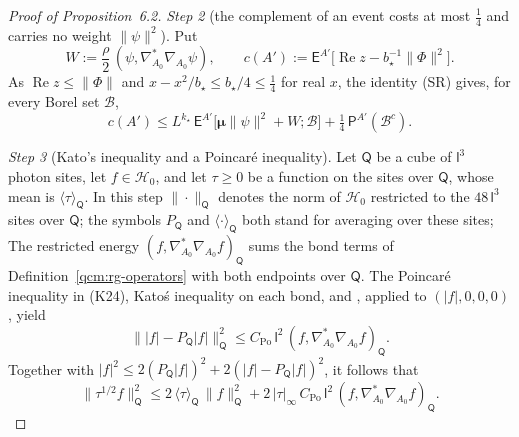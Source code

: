 \documentclass[11pt,letterpaper,reqno]{amsart}
\theoremstyle{definition}
\begin{document}
\begin{proof}[Proof of Proposition~6.2]
\emph{Step 2} (the complement of an event costs at most $\frac14$ and carries no weight $\|\psi\|^2$).
Put
\begin{equation*}
W:=\frac\rho2\,(\psi,\nabla^*_{A_0}\nabla_{A_0}\psi),\qquad c(A'):=\mathsf E^{A'}\bigl[\operatorname{Re}z-b_\star^{-1}\|\Phi\|^2\bigr].
\end{equation*}
As $\operatorname{Re}z\le\|\Phi\|$ and $x-x^2/b_\star\le b_\star/4\le\frac14$ for real $x$, the identity (SR) gives, for every Borel set $\mathcal B$,
\begin{equation*}
c(A')\le L^{k_\star}\,\mathsf E^{A'}\bigl[\boldsymbol\mu\|\psi\|^2+W;\mathcal B\bigr]+\tfrac14\,\mathsf P^{A'}(\mathcal B^c).
\end{equation*}

\emph{Step 3} (Kato's inequality and a Poincar\'e inequality).
Let $\mathsf Q$ be a cube of $\mathsf l^3$ photon sites, let $f\in\mathcal H_0$, and let $\tau\ge0$ be a function on the sites over $\mathsf Q$, whose mean is $\langle\tau\rangle_{\mathsf Q}$.
In this step $\|\cdot\|_{\mathsf Q}$ denotes the norm of $\mathcal H_0$ restricted to the $48\,\mathsf l^3$ sites over $\mathsf Q$;
the symbols $P_{\mathsf Q}$ and $\langle\cdot\rangle_{\mathsf Q}$ both stand for averaging over these sites;
The restricted energy $(f,\nabla^*_{A_0}\nabla_{A_0}f)_{\mathsf Q}$ sums the bond terms of Definition~\ref{qcm:rg-operators} with both endpoints over $\mathsf Q$.
The Poincar\'e inequality in (K24), Kato\'s inequality on each bond, and \cite[Proposition~9.1 and its proof]{QEDConstruction}, applied to $(|f|,0,0,0)$, yield
\begin{equation*}
\bigl\||f|-P_{\mathsf Q}|f|\bigr\|^2_{\mathsf Q}\le C_{\mathrm{Po}}\,\mathsf l^2\,(f,\nabla^*_{A_0}\nabla_{A_0}f)_{\mathsf Q}.
\end{equation*}
Together with $|f|^2\le2(P_{\mathsf Q}|f|)^2+2(|f|-P_{\mathsf Q}|f|)^2$, it follows that
\begin{equation*}
\|\tau^{1/2}f\|^2_{\mathsf Q}\le2\,\langle\tau\rangle_{\mathsf Q}\,\|f\|^2_{\mathsf Q}+2\,|\tau|_\infty\,C_{\mathrm{Po}}\,\mathsf l^2\,(f,\nabla^*_{A_0}\nabla_{A_0}f)_{\mathsf Q}.
\end{equation*}


\end{proof}
\end{document}
